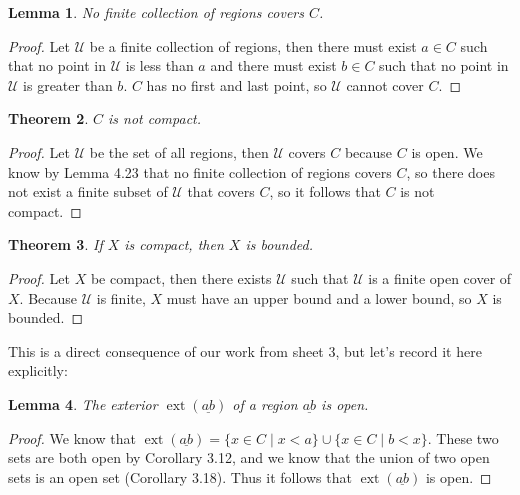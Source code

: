 \documentclass[12pt]{article}
\renewcommand{\_}[1]{\underline{ #1 }}
\DeclareMathOperator{\ext}{ext}
\newtheorem{theorem}{Theorem}[section]
\newtheorem{lemma}[theorem]{Lemma}
\theoremstyle{definition}
\numberwithin{equation}{subsection}
\begin{document}
\begin{lemma}
No finite collection of regions covers $C$.
\end{lemma}

\begin{proof}
Let $\mathcal{U}$ be a finite collection of regions, then there must exist $a \in C$ such that no point in $\mathcal{U}$ is less than $a$ and there must exist $b \in C$ such that no point in $\mathcal{U}$ is greater than $b$. $C$ has no first and last point, so $\mathcal{U}$ cannot cover $C$.
\end{proof}

\begin{theorem}  
$C$ is not compact.
\end{theorem}

\begin{proof}
Let $\mathcal{U}$ be the set of all regions, then $\mathcal{U}$ covers $C$ because $C$ is open. We know by Lemma 4.23 that no finite collection of regions covers $C$, so there does not exist a finite subset of $\mathcal{U}$ that covers $C$, so it follows that $C$ is not compact.
\end{proof}

\begin{theorem}  If $X$ is compact, then $X$ is bounded.
\end{theorem}

\begin{proof}
Let $X$ be compact, then there exists $\mathcal{U}$ such that $\mathcal{U}$ is a finite open cover of $X$. Because $\mathcal{U}$ is finite, $X$ must have an upper bound and a lower bound, so $X$ is bounded.
\end{proof}

\noindent This is a direct consequence of our work from sheet 3, but let's record it here explicitly:

\begin{lemma}  The exterior $\ext(\_{ab})$ of a region $\_{ab}$ is open.
\end{lemma}

\begin{proof}
We know that $\ext(\_{ab}) = \{x \in C \mid x < a\} \cup \{x \in C \mid b < x\}$. These two sets are both open by Corollary 3.12, and we know that the union of two open sets is an open set (Corollary 3.18). Thus it follows that $\ext(\_{ab})$ is open.
\end{proof}
\end{document}

